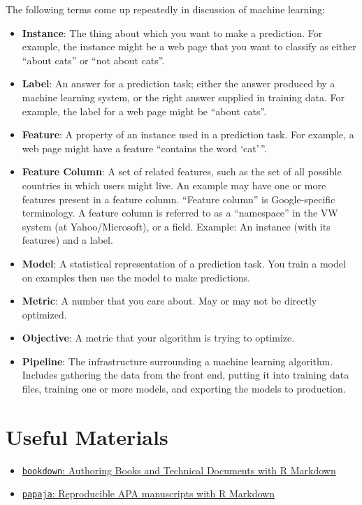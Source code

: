 \documentclass[]{book}
\providecommand{\tightlist}{%
  \setlength{\itemsep}{0pt}\setlength{\parskip}{0pt}}
\begin{document}
The following terms come up repeatedly in discussion of machine learning\citep{GoogleRulesML}:

\begin{itemize}
\tightlist
\item
  \textbf{Instance}: The thing about which you want to make a prediction. For
  example, the instance might be a web page that you want to classify as either
  ``about cats'' or ``not about cats''.
\item
  \textbf{Label}: An answer for a prediction task; either the answer produced by a
  machine learning system, or the right answer supplied in training data. For
  example, the label for a web page might be ``about cats''.
\item
  \textbf{Feature}: A property of an instance used in a prediction task. For example,
  a web page might have a feature ``contains the word `cat'\,''.
\item
  \textbf{Feature Column}: A set of related features, such as the set of all possible
  countries in which users might live. An example may have one or more features
  present in a feature column. ``Feature column'' is Google-specific terminology. A
  feature column is referred to as a ``namespace'' in the VW system (at
  Yahoo/Microsoft), or a field. Example: An instance (with its features) and a
  label.
\item
  \textbf{Model}: A statistical representation of a prediction task. You train a
  model on examples then use the model to make predictions.
\item
  \textbf{Metric}: A number that you care about. May or may not be directly
  optimized.
\item
  \textbf{Objective}: A metric that your algorithm is trying to optimize.
\item
  \textbf{Pipeline}: The infrastructure surrounding a machine learning algorithm.
  Includes gathering the data from the front end, putting it into training data
  files, training one or more models, and exporting the models to production.
\end{itemize}

\hypertarget{useful-materials}{%
\section{Useful Materials}\label{useful-materials}}

\begin{itemize}
\tightlist
\item
  \href{https://bookdown.org/yihui/bookdown/}{\texttt{bookdown}: Authoring Books and Technical Documents with R Markdown}
\item
  \href{https://crsh.github.io/papaja_man/}{\texttt{papaja}: Reproducible APA manuscripts with R Markdown}
\end{itemize}
\end{document}

